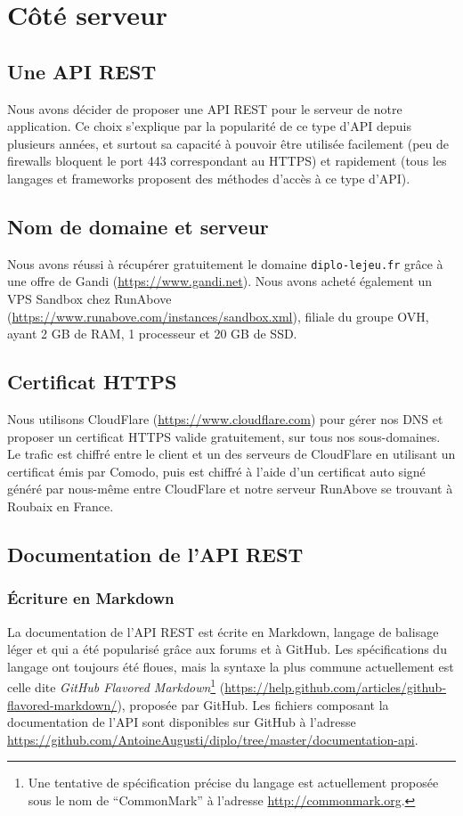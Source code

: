 \section{Côté serveur}

	\subsection{Une API REST}
		Nous avons décider de proposer une API REST pour le serveur de notre application. Ce choix s'explique par la popularité de ce type d'API depuis plusieurs années, et surtout sa capacité à pouvoir être utilisée facilement (peu de firewalls bloquent le port 443 correspondant au HTTPS) et rapidement (tous les langages et frameworks proposent des méthodes d'accès à ce type d'API).

	\subsection{Nom de domaine et serveur}
		Nous avons réussi à récupérer gratuitement le domaine \texttt{diplo-lejeu.fr} grâce à une offre de Gandi (\url{https://www.gandi.net}). Nous avons acheté également un VPS Sandbox chez RunAbove (\url{https://www.runabove.com/instances/sandbox.xml}), filiale du groupe OVH, ayant 2 GB de RAM, 1 processeur et 20 GB de SSD.

	\subsection{Certificat HTTPS}
		Nous utilisons CloudFlare (\url{https://www.cloudflare.com}) pour gérer nos DNS et proposer un certificat HTTPS valide gratuitement, sur tous nos sous-domaines. Le trafic est chiffré entre le client et un des serveurs de CloudFlare en utilisant un certificat émis par Comodo, puis est chiffré à l'aide d'un certificat auto signé généré par nous-même entre CloudFlare et notre serveur RunAbove se trouvant à Roubaix en France.

	\subsection{Documentation de l'API REST}
		\subsubsection{Écriture en Markdown}
			La documentation de l'API REST est écrite en Markdown, langage de balisage léger et qui a été popularisé grâce aux forums et à GitHub. Les spécifications du langage ont toujours été floues, mais la syntaxe la plus commune actuellement est celle dite \textit{GitHub Flavored Markdown}\footnote{Une tentative de spécification précise du langage est actuellement proposée sous le nom de \enquote{CommonMark} à l'adresse \url{http://commonmark.org}.} (\url{https://help.github.com/articles/github-flavored-markdown/}), proposée par GitHub. Les fichiers composant la documentation de l'API sont disponibles sur GitHub à l'adresse \url{https://github.com/AntoineAugusti/diplo/tree/master/documentation-api}.\\

